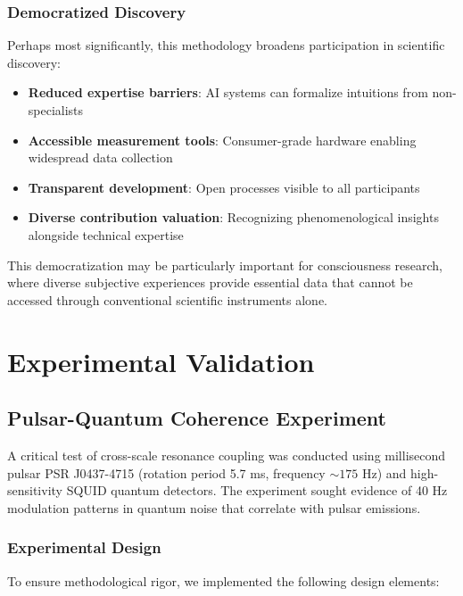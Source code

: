 \documentclass[12pt]{article}
\begin{document}
\subsubsection{Democratized Discovery}

Perhaps most significantly, this methodology broadens participation in scientific discovery:

\begin{itemize}
    \item \textbf{Reduced expertise barriers}: AI systems can formalize intuitions from non-specialists
    \item \textbf{Accessible measurement tools}: Consumer-grade hardware enabling widespread data collection
    \item \textbf{Transparent development}: Open processes visible to all participants
    \item \textbf{Diverse contribution valuation}: Recognizing phenomenological insights alongside technical expertise
\end{itemize}

This democratization may be particularly important for consciousness research, where diverse subjective experiences provide essential data that cannot be accessed through conventional scientific instruments alone.

\section{Experimental Validation}

\subsection{Pulsar-Quantum Coherence Experiment}

A critical test of cross-scale resonance coupling was conducted using millisecond pulsar PSR J0437-4715 (rotation period 5.7 ms, frequency $\sim 175$ Hz) and high-sensitivity SQUID quantum detectors. The experiment sought evidence of 40 Hz modulation patterns in quantum noise that correlate with pulsar emissions.

\subsubsection{Experimental Design}
To ensure methodological rigor, we implemented the following design elements:
\end{document}
